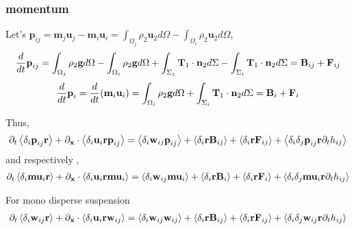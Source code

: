 \subsubsection*{momentum}
Let's $\textbf{p}_{ij} = \textbf{m}_j \textbf{u}_j-\textbf{m}_i \textbf{u}_i =\int_{\Omega_j}\rho_2 \textbf{u}_2d\Omega
- \int_{\Omega_i}\rho_2 \textbf{u}_2d\Omega$, 
\begin{equation}
\frac{d}{d t} \textbf{p}_{ij} 
= \int_{\Omega_j}\rho_2\textbf{g}d\Omega 
- \int_{\Omega_i}\rho_2\textbf{g}d\Omega
+ \int_{\Sigma_j} \textbf{T}_1 \cdot \textbf{n}_2d\Sigma
-\int_{\Sigma_i} \textbf{T}_1 \cdot \textbf{n}_2d\Sigma
=\textbf{B}_{ij} + \textbf{F}_{ij}
\end{equation}
\begin{equation}
\frac{d}{d t} \textbf{p}_{i} 
= \frac{d}{d t} (\textbf{m}_i \textbf{u}_i)
= \int_{\Omega_i}\rho_2\textbf{g}d\Omega
+ \int_{\Sigma_i} \textbf{T}_1 \cdot \textbf{n}_2d\Sigma
= \textbf{B}_{i} + \textbf{F}_{i}
\end{equation}

Thus,
\begin{multline*}
    \partial_t \left<\delta_i\textbf{p}_{ij}\textbf{r}\right> 
  + \partial_\textbf{x} \cdot \left<\delta_i\textbf{u}_i \textbf{r}\textbf{p}_{ij}\right>
  = \left<\delta_i\textbf{w}_{ij}\textbf{p}_{ij}\right>
  + \left<\delta_i\textbf{r}\textbf{B}_{ij}\right> 
  + \left<\delta_i\textbf{r}\textbf{F}_{ij}\right> 
  + \left<\delta_i\delta_{j}\textbf{p}_{ij}\textbf{r}\partial_t h_{ij} \right>
\end{multline*}
and respectively , 
\begin{multline*}
    \partial_t \left<\delta_i\textbf{mu}_{i}\textbf{r}\right> 
  + \partial_\textbf{x} \cdot \left<\delta_i\textbf{u}_i \textbf{r}\textbf{mu}_{i}\right>
  = \left<\delta_i\textbf{w}_{ij}\textbf{mu}_{i}\right>
  + \left<\delta_i\textbf{r}\textbf{B}_{i}\right> 
  + \left<\delta_i\textbf{r}\textbf{F}_{i}\right> 
  + \left<\delta_i\delta_{j}\textbf{mu}_{i}\textbf{r}\partial_t h_{ij} \right>
\end{multline*}

For mono disperse suspension 
\begin{multline*}
    \partial_t \left<\delta_i\textbf{w}_{ij}\textbf{r}\right> 
  + \partial_\textbf{x} \cdot \left<\delta_i\textbf{u}_i \textbf{r}\textbf{w}_{ij}\right>
  = \left<\delta_i\textbf{w}_{ij}\textbf{w}_{ij}\right>
  + \left<\delta_i\textbf{r}\textbf{B}_{ij}\right> 
  + \left<\delta_i\textbf{r}\textbf{F}_{ij}\right> 
  + \left<\delta_i\delta_{j}\textbf{w}_{ij}\textbf{r}\partial_t h_{ij} \right>
\end{multline*}
